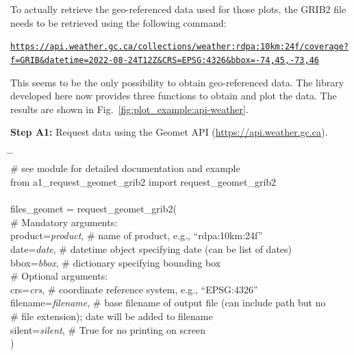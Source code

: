 \documentclass[10pt,a4paper,titlepage,parskip]{scrartcl}
\newenvironment{ttfont}{\fontfamily{\ttdefault}\selectfont}{\par}
\newcommand{\GRAU}[1]{\textcolor{ufzgray2}{#1}}
\begin{document}
To actually retrieve the geo-referenced data used for those plots, the GRIB2 file needs to be retrieved using the following command:
\begin{framed}
\texttt{\url{https://api.weather.gc.ca/collections/weather:rdpa:10km:24f/coverage?f=GRIB&datetime=2022-08-24T12Z&CRS=EPSG:4326&bbox=-74,45,-73,46}}
\end{framed}
This seems to be the only possibility to obtain geo-referenced data. The library developed here now provides three functions to obtain and plot the data. The results are shown in Fig.~\ref{fig:plot_example:api-weather}.

\textbf{Step A1:} Request data using the Geomet API (\url{https://api.weather.gc.ca}).
\begin{framed}
	\vspace*{-1.2cm}
	\begin{ttfont}
	\begin{tabbing}
		\hspace{1.0cm} \= \hspace{3.2cm} \= \kill \\[4pt]
		\GRAU{\# see module for detailed documentation and example}\\
		from a1\_request\_geomet\_grib2 import request\_geomet\_grib2\\
		\\
		files\_geomet = request\_geomet\_grib2(\\
		\> \GRAU{\# Mandatory arguments:}\\
		\> product=\textit{product}, \> \GRAU{\# name of product, e.g., ``rdpa:10km:24f''}\\
		\> date=\textit{date},\> \GRAU{\# datetime object specifying date (can be list of dates)}\\
		\> bbox=\textit{bbox},\> \GRAU{\# dictionary specifying bounding box}\\
		\> \GRAU{\# Optional arguments:}\\
		\> crs=\textit{crs},\> \GRAU{\# coordinate reference system, e.g., ``EPSG:4326''}\\
		\> filename=\textit{filename},\> \GRAU{\# base filename of output file (can include path but no}\\
		\>                           \> \GRAU{\# file extension); date will be added to filename}\\
		\> silent=\textit{silent}, \> \GRAU{\# True for no printing on screen}\\
		\> ) \> 
	\end{tabbing}
	\end{ttfont}
	\vspace*{-0.3cm}
\end{framed}
\end{document}
